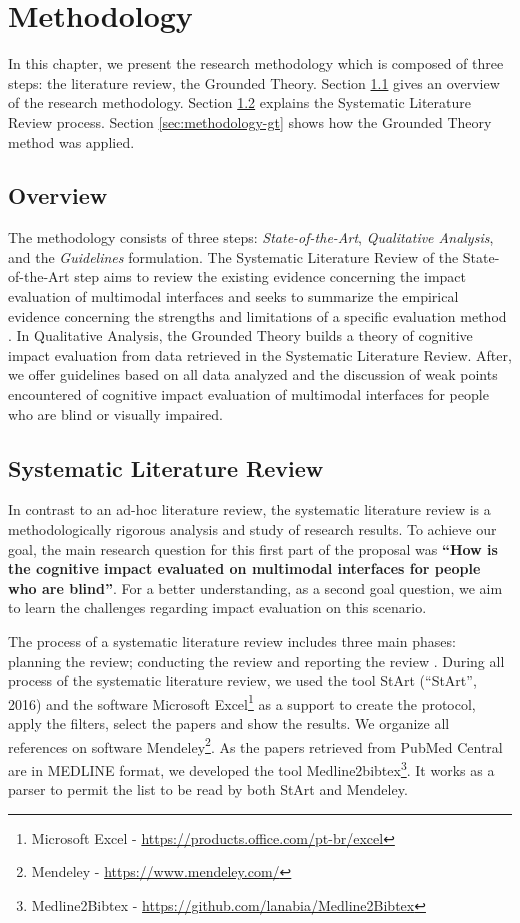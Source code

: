 \chapter{Methodology}
\label{chap:metodologia}

In this chapter, we present the research methodology which is composed of three steps: the literature review, the Grounded Theory. Section \ref{sec:methodology-overview} gives an overview of the research methodology. Section \ref{sec:methodology-slr} explains the Systematic Literature Review process. Section \ref{sec:methodology-gt} shows how the Grounded Theory method was applied.


\section{Overview}
\label{sec:methodology-overview}
The methodology consists of three steps: \textit{State-of-the-Art}, \textit{Qualitative Analysis}, and the \textit{Guidelines} formulation. The Systematic Literature Review of the State-of-the-Art step aims to review the existing evidence concerning the impact evaluation of multimodal interfaces and seeks to summarize the empirical evidence concerning the strengths and limitations of a specific evaluation method \cite{Kitchenham2007}. In Qualitative Analysis, the Grounded Theory  builds a theory of cognitive impact evaluation from data retrieved in the Systematic Literature Review. After, we offer guidelines based on all data analyzed and the discussion of weak points encountered of cognitive impact evaluation of multimodal interfaces for people who are blind or visually impaired. 


\section{Systematic Literature Review}
\label{sec:methodology-slr}
In contrast to an ad-hoc literature review, the systematic literature review is a methodologically rigorous analysis and study of research results. To achieve our goal, the main research question for this first part of the proposal was \textbf{``How is the cognitive impact evaluated on multimodal interfaces for people who are blind''}. For a better understanding, as a second goal question, we aim to learn the challenges regarding impact evaluation on this scenario.

The process of a systematic literature review includes three main phases: planning the review; conducting the review and reporting the review \cite{Kitchenham2007}. During all process of the systematic literature review, we used the tool StArt (``StArt'', 2016) and the software Microsoft Excel\footnote{Microsoft Excel - \url{https://products.office.com/pt-br/excel}} as a support to create the protocol, apply the filters, select the papers and show the results. We organize all references on software Mendeley\footnote{Mendeley - \url{https://www.mendeley.com/}}. As the papers retrieved from PubMed Central are in MEDLINE format, we developed the tool Medline2bibtex\footnote{Medline2Bibtex - \url{https://github.com/lanabia/Medline2Bibtex}}. It works as a parser to permit the list to be read by both StArt and Mendeley.

